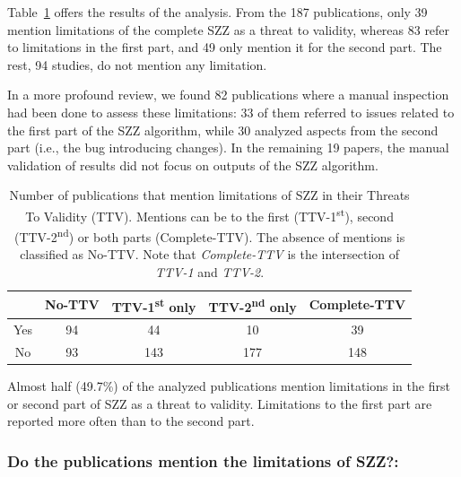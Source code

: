\documentclass[a4paper, 12pt]{book}
\begin{document}
Table~\ref{tableTTV} offers the results of the analysis. From the 187 publications, only 39 mention limitations of the complete SZZ as a threat to validity, whereas 83 refer to limitations in the first part, and 49 only mention it for the second part. The rest, 94 studies, do not mention any limitation.

In a more profound review, we found 82 publications where a manual inspection had been done to assess these limitations: 33 of them referred to issues related to the first part of the SZZ algorithm, while 30 analyzed aspects from the second part (i.e., the bug introducing changes).
In the remaining 19 papers, the manual validation of results did not focus on outputs of the SZZ algorithm.

\begin{table}[!t]
\renewcommand{\arraystretch}{0.8}
\caption{Number of publications that mention limitations of SZZ in their Threats To Validity (TTV). Mentions can be to the first (TTV-1\textsuperscript{st}), second (TTV-2\textsuperscript{nd}) or both parts (Complete-TTV). The absence of mentions is classified as No-TTV. Note that \emph{Complete-TTV} is the intersection of \emph{TTV-1} and \emph{TTV-2}.}
\label{tableTTV}
\centering
\begin{tabular}{|c|c|c|c|c|}
\hline
& No-TTV & TTV-1\textsuperscript{st} only & TTV-2\textsuperscript{nd} only & Complete-TTV \\
\hline
\hline
Yes & 94 & 44 & 10 & 39 \\
\hline
No & 93 & 143 & 177 & 148 \\
\hline
\end{tabular}
\end{table}

 Almost half (49.7\%) of the analyzed publications mention limitations in the first or second part of SZZ as a threat to validity. Limitations to the first part are reported more often than to the second part.

\subsubsection{Do the publications mention the limitations of SZZ?:}
\end{document}
